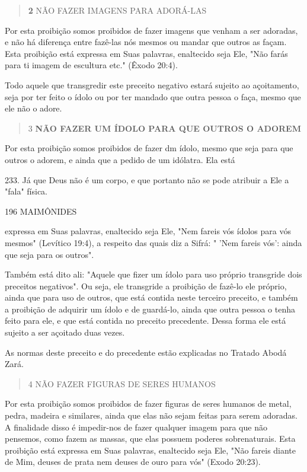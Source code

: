 \begin{quote}
\textbf{2} NÃO FAZER IMAGENS PARA ADORÁ-LAS
\end{quote}

Por esta proibição somos proibidos de fazer imagens que venham a ser
adoradas, e não há diferença entre fazê-las nós mesmos ou mandar que
outros as façam. Esta proibição está expressa em Suas palavras,
enaltecido seja Ele, "Não farás para ti imagem de escultura etc." (Êxodo
20:4).

Todo aquele que transgredir este preceito negativo estará sujeito ao
açoitamento, seja por ter feito o ídolo ou por ter mandado que outra
pessoa o faça, mesmo que ele não o adore.

\begin{quote}
3 \textbf{NÃO FAZER UM ÍDOLO PARA QUE OUTROS O ADOREM}
\end{quote}

Por esta proibição somos proibidos de fazer dm ídolo, mesmo que seja
para que outros o adorem, e ainda que a pedido de um idólatra. Ela está

233. Já que Deus não é um corpo, e que portanto não se pode atribuir a
Ele a "fala" física.

196 MAIMÔNIDES

expressa em Suas palavras, enaltecido seja Ele, "Nem fareis vós ídolos
para vós mesmos" (Levítico 19:4), a respeito das quais diz a Sifrá: "
'Nem fareis vós': ainda que seja para os outros".

Também está dito ali: "Aquele que fizer um ídolo para uso próprio
transgride dois preceitos negativos". Ou seja, ele transgride a
proibição de fazê-lo ele próprio, ainda que para uso de outros, que está
contida neste terceiro pre­ceito, e também a proibição de adquirir um
ídolo e de guardá-lo, ainda que ou­tra pessoa o tenha feito para ele, e
que está contida no preceito precedente. Dessa forma ele está sujeito a
ser açoitado duas vezes.

As normas deste preceito e do precedente estão explicadas no Tra­tado
Abodá Zará.

\begin{quote}
4 NÃO FAZER FIGURAS DE SERES HUMANOS
\end{quote}

Por esta proibição somos proibidos de fazer figuras de seres huma­nos de
metal, pedra, madeira e similares, ainda que elas não sejam feitas para
serem adoradas. A finalidade disso é impedir-nos de fazer qualquer
imagem pa­ra que não pensemos, como fazem as massas, que elas possuem
poderes sobre­naturais. Esta proibição está expressa em Suas palavras,
enaltecido seja Ele, "Não fareis diante de Mim, deuses de prata nem
deuses de ouro para vós" (Exodo 20:23).

